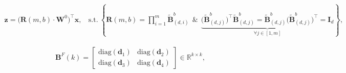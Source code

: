 \begin{equation}
    \begin{aligned}\nonumber
    \bm{z}=\big(\bm{R}(m,b)\cdot\bm{W}^0\big)^\top\bm{x},~~~~\text{s.t.}~\left\{\bm{R}(m,b)=\prod_{i=1}^m \tilde{\bm{B}}^b_{(d,i)}~~\&~~\underbrace{\big(\tilde{\bm{B}}^b_{(d,j)}\big)^\top\tilde{\bm{B}}^b_{(d,j)}=\tilde{\bm{B}}^b_{(d,j)}\big(\tilde{\bm{B}}^b_{(d,j)}\big)^\top\!=\bm{I}_d}_{\forall j\in [1, m]}\right\},
    \end{aligned}
\end{equation}

\begin{equation}\label{eq:but_factor}
\begin{aligned}
    \bm{B}^F(k)=\begin{bmatrix}
    \text{diag}(\bm{d}_1) & \text{diag}(\bm{d}_2) \\
    \text{diag}(\bm{d}_3) & \text{diag}(\bm{d}_4)
    \end{bmatrix}\in\mathbb{R}^{k\times k},
\end{aligned}
\end{equation}

